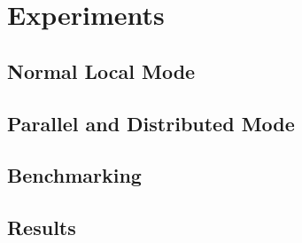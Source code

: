 
\chapter{Experiments}\label{chapter:experiments}

\section{Normal Local Mode}

\section{Parallel and Distributed Mode}

\section{Benchmarking}

\section{Results}